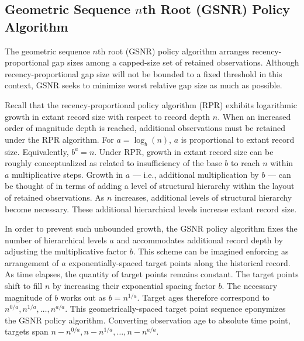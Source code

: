 \subsection{Geometric Sequence $n$th Root (GSNR) Policy Algorithm}
\label{sec:geom-seq-nth-root-algo}

The geometric sequence $n$th root (GSNR) policy algorithm arranges recency-proportional gap sizes among a capped-size set of retained observations.
Although recency-proportional gap size will not be bounded to a fixed threshold in this context, GSNR seeks to minimize worst relative gap size as much as possible.

Recall that the recency-proportional policy algorithm (RPR) exhibits logarithmic growth in extant record size with respect to record depth $n$.
When an increased order of magnitude depth is reached, additional observations must be retained under the RPR algorithm.
For $a = \log_b(n)$, $a$ is proportional to extant record size.
Equivalently, $b^a = n$.
Under RPR, growth in extant record size can be roughly conceptualized as related to insufficiency of the base $b$ to reach $n$ within $a$ multiplicative steps.
Growth in $a$ --- i.e., additional multiplication by $b$ --- can be thought of in terms of adding a level of structural hierarchy within the layout of retained observations.
As $n$ increases, additional levels of structural hierarchy become necessary.
These additional hierarchical levels increase extant record size.

In order to prevent such unbounded growth, the GSNR policy algorithm fixes the number of hierarchical levels $a$ and accommodates additional record depth by adjusting the multiplicative factor $b$.
This scheme can be imagined enforcing as arrangement of $a$ exponentially-spaced target points along the historical record.
As time elapses, the quantity of target points remains constant.
The target points shift to fill $n$ by increasing their exponential spacing factor $b$.
The necessary magnitude of $b$ works out as $b = n^{1/a}$.
Target ages therefore correspond to $n^{0/a}, n^{1/a}, \ldots, n^{a/a}$.
This geometrically-spaced target point sequence eponymizes the GSNR policy algorithm.
Converting observation age to absolute time point, targets span $n - n^{0/a}, n - n^{1/a}, \ldots, n - n^{a/a}$.

